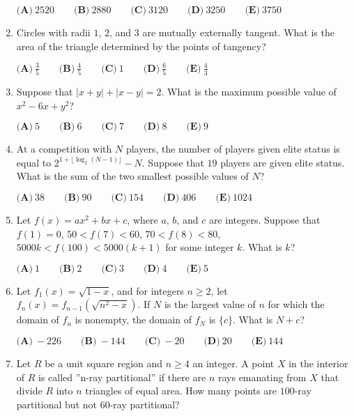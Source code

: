 \documentclass{article}
\begin{document}
\begin{enumerate}[label=\arabic*., itemsep=0.5em]
\(
\textbf{(A)}\ 2520 \qquad
\textbf{(B)}\ 2880 \qquad
\textbf{(C)}\ 3120 \qquad
\textbf{(D)}\ 3250 \qquad
\textbf{(E)}\ 3750 \)\par \vspace{0.5em}\item Circles with radii \(1\), \(2\), and \(3\) are mutually externally tangent. What is the area of the triangle determined by the points of tangency?

\(
\textbf{(A)}\ \frac{3}{5} \qquad
\textbf{(B)}\ \frac{4}{5} \qquad
\textbf{(C)}\ 1 \qquad
\textbf{(D)}\ \frac{6}{5} \qquad
\textbf{(E)}\ \frac{4}{3} \)\par \vspace{0.5em}\item Suppose that \(\left|x+y\right|+\left|x-y\right|=2\). What is the maximum possible value of \(x^2-6x+y^2\)?

\(
\textbf{(A)}\ 5 \qquad
\textbf{(B)}\ 6 \qquad
\textbf{(C)}\ 7 \qquad
\textbf{(D)}\ 8 \qquad
\textbf{(E)}\ 9 \)\par \vspace{0.5em}\item At a competition with \(N\) players, the number of players given elite status is equal to \(2^{1+\lfloor \log_{2} (N-1) \rfloor}-N\). Suppose that \(19\) players are given elite status. What is the sum of the two smallest possible values of \(N\)?

\(
\textbf{(A)}\ 38 \qquad
\textbf{(B)}\ 90 \qquad
\textbf{(C)}\ 154 \qquad
\textbf{(D)}\ 406 \qquad
\textbf{(E)}\ 1024 \)\par \vspace{0.5em}\item Let \(f(x)=ax^2+bx+c\), where \(a\), \(b\), and \(c\) are integers. Suppose that \(f(1)=0\), \(50<f(7)<60\), \(70<f(8)<80\), \(5000k<f(100)<5000(k+1)\) for some integer \(k\). What is \(k\)?

\(
\textbf{(A)}\ 1 \qquad
\textbf{(B)}\ 2 \qquad
\textbf{(C)}\ 3 \qquad
\textbf{(D)}\ 4 \qquad
\textbf{(E)}\ 5 \)\par \vspace{0.5em}\item Let \(f_{1}(x)=\sqrt{1-x}\), and for integers \(n \geq 2\), let \(f_{n}(x)=f_{n-1}(\sqrt{n^2 - x})\). If \(N\) is the largest value of \(n\) for which the domain of \(f_{n}\) is nonempty, the domain of \(f_{N}\) is \(\{ c\}\). What is \(N+c\)?

\(
\textbf{(A)}\ -226 \qquad
\textbf{(B)}\ -144 \qquad
\textbf{(C)}\ -20 \qquad
\textbf{(D)}\ 20 \qquad
\textbf{(E)}\ 144 \)\par \vspace{0.5em}\item Let \(R\) be a unit square region and \(n \geq 4\) an integer. A point \(X\) in the interior of \(R\) is called ''n-ray partitional'' if there are \(n\) rays emanating from \(X\) that divide \(R\) into \(n\) triangles of equal area. How many points are \(100\)-ray partitional but not \(60\)-ray partitional?


\end{enumerate}
\end{document}
